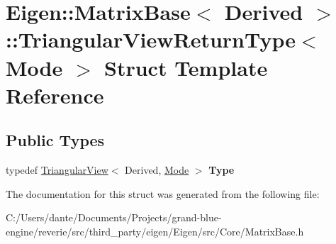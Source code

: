 \hypertarget{struct_eigen_1_1_matrix_base_1_1_triangular_view_return_type}{}\section{Eigen\+::Matrix\+Base$<$ Derived $>$\+::Triangular\+View\+Return\+Type$<$ Mode $>$ Struct Template Reference}
\label{struct_eigen_1_1_matrix_base_1_1_triangular_view_return_type}
\subsection*{Public Types}
\begin{DoxyCompactItemize}
\item 
\mbox{\label{struct_eigen_1_1_matrix_base_1_1_triangular_view_return_type_a12df3e7a526bab6affc069db34ce4b69}} 
typedef \mbox{\hyperlink{class_eigen_1_1_triangular_view}{Triangular\+View}}$<$ Derived, \mbox{\hyperlink{struct_mode}{Mode}} $>$ {\bfseries Type}
\end{DoxyCompactItemize}


The documentation for this struct was generated from the following file\+:\begin{DoxyCompactItemize}
\item 
C\+:/\+Users/dante/\+Documents/\+Projects/grand-\/blue-\/engine/reverie/src/third\+\_\+party/eigen/\+Eigen/src/\+Core/Matrix\+Base.\+h\end{DoxyCompactItemize}
